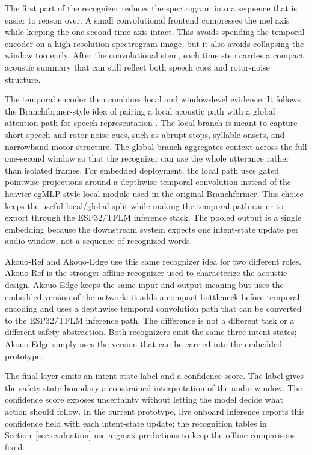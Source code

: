The first part of the recognizer reduces the spectrogram into a sequence that is easier to reason over. A small convolutional frontend compresses the mel axis while keeping the one-second time axis intact. This avoids spending the temporal encoder on a high-resolution spectrogram image, but it also avoids collapsing the window too early. After the convolutional stem, each time step carries a compact acoustic summary that can still reflect both speech cues and rotor-noise structure.

The temporal encoder then combines local and window-level evidence. It follows the Branchformer-style idea of pairing a local acoustic path with a global attention path for speech representation \cite{peng2022branchformer}. The local branch is meant to capture short speech and rotor-noise cues, such as abrupt stops, syllable onsets, and narrowband motor structure. The global branch aggregates context across the full one-second window so that the recognizer can use the whole utterance rather than isolated frames. For embedded deployment, the local path uses gated pointwise projections around a depthwise temporal convolution instead of the heavier cgMLP-style local module used in the original Branchformer. This choice keeps the useful local/global split while making the temporal path easier to export through the ESP32/TFLM inference stack. The pooled output is a single embedding because the downstream system expects one intent-state update per audio window, not a sequence of recognized words.

Akouo-Ref and Akouo-Edge use this same recognizer idea for two different roles. Akouo-Ref is the stronger offline recognizer used to characterize the acoustic design. Akouo-Edge keeps the same input and output meaning but uses the embedded version of the network: it adds a compact bottleneck before temporal encoding and uses a depthwise temporal convolution path that can be converted to the ESP32/TFLM inference path. The difference is not a different task or a different safety abstraction. Both recognizers emit the same three intent states; Akouo-Edge simply uses the version that can be carried into the embedded prototype.

The final layer emits an intent-state label and a confidence score. The label gives the safety-state boundary a constrained interpretation of the audio window. The confidence score exposes uncertainty without letting the model decide what action should follow. In the current prototype, live onboard inference reports this confidence field with each intent-state update; the recognition tables in Section~\ref{sec:evaluation} use argmax predictions to keep the offline comparisons fixed.


